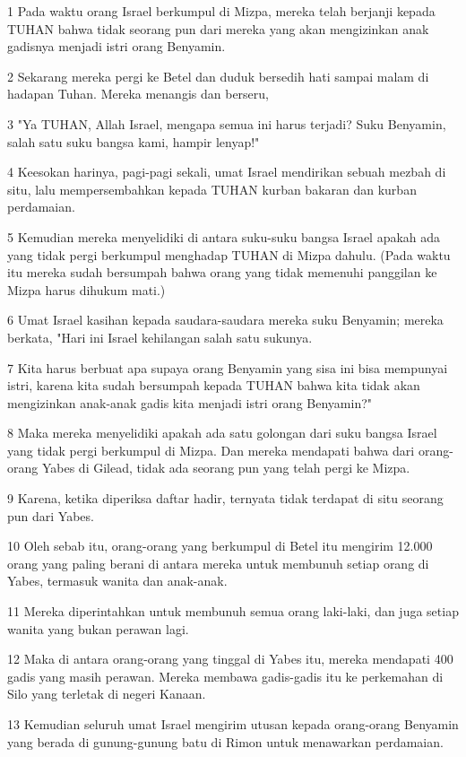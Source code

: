 \par 1 Pada waktu orang Israel berkumpul di Mizpa, mereka telah berjanji kepada TUHAN bahwa tidak seorang pun dari mereka yang akan mengizinkan anak gadisnya menjadi istri orang Benyamin.
\par 2 Sekarang mereka pergi ke Betel dan duduk bersedih hati sampai malam di hadapan Tuhan. Mereka menangis dan berseru,
\par 3 "Ya TUHAN, Allah Israel, mengapa semua ini harus terjadi? Suku Benyamin, salah satu suku bangsa kami, hampir lenyap!"
\par 4 Keesokan harinya, pagi-pagi sekali, umat Israel mendirikan sebuah mezbah di situ, lalu mempersembahkan kepada TUHAN kurban bakaran dan kurban perdamaian.
\par 5 Kemudian mereka menyelidiki di antara suku-suku bangsa Israel apakah ada yang tidak pergi berkumpul menghadap TUHAN di Mizpa dahulu. (Pada waktu itu mereka sudah bersumpah bahwa orang yang tidak memenuhi panggilan ke Mizpa harus dihukum mati.)
\par 6 Umat Israel kasihan kepada saudara-saudara mereka suku Benyamin; mereka berkata, "Hari ini Israel kehilangan salah satu sukunya.
\par 7 Kita harus berbuat apa supaya orang Benyamin yang sisa ini bisa mempunyai istri, karena kita sudah bersumpah kepada TUHAN bahwa kita tidak akan mengizinkan anak-anak gadis kita menjadi istri orang Benyamin?"
\par 8 Maka mereka menyelidiki apakah ada satu golongan dari suku bangsa Israel yang tidak pergi berkumpul di Mizpa. Dan mereka mendapati bahwa dari orang-orang Yabes di Gilead, tidak ada seorang pun yang telah pergi ke Mizpa.
\par 9 Karena, ketika diperiksa daftar hadir, ternyata tidak terdapat di situ seorang pun dari Yabes.
\par 10 Oleh sebab itu, orang-orang yang berkumpul di Betel itu mengirim 12.000 orang yang paling berani di antara mereka untuk membunuh setiap orang di Yabes, termasuk wanita dan anak-anak.
\par 11 Mereka diperintahkan untuk membunuh semua orang laki-laki, dan juga setiap wanita yang bukan perawan lagi.
\par 12 Maka di antara orang-orang yang tinggal di Yabes itu, mereka mendapati 400 gadis yang masih perawan. Mereka membawa gadis-gadis itu ke perkemahan di Silo yang terletak di negeri Kanaan.
\par 13 Kemudian seluruh umat Israel mengirim utusan kepada orang-orang Benyamin yang berada di gunung-gunung batu di Rimon untuk menawarkan perdamaian.
